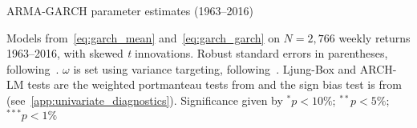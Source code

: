 
\begin{table}
  \centering
  \footnotesize
  \renewcommand{\arraystretch}{1.2}

  \caption{ARMA-GARCH parameter estimates (1963--2016)}

  \begin{longcaption}
    Models from~\autoref{eq:garch_mean} and~\autoref{eq:garch_garch} on $N = 2,766$ weekly returns 1963--2016, with skewed \emph{t} innovations. Robust standard errors in parentheses, following~\textcite{White1982}. $\omega$ is set using variance targeting, following~\textcite{EngleMezrich1995}. Ljung-Box and ARCH-LM tests are the weighted portmanteau tests from \textcite{FisherGallagher2012} and the sign bias test is from \textcite{EngleNg1993} (see~\autoref{app:univariate_diagnostics}). Significance given by $^{*}p<10\%$; $^{**}p<5\%$; $^{***}p<1\%$
  \end{longcaption}
 

\end{table}
